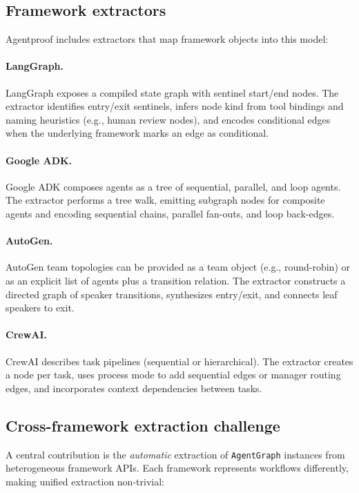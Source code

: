 \subsection{Framework extractors}
Agentproof includes extractors that map framework objects into this model:

\paragraph{LangGraph.}
LangGraph exposes a compiled state graph with sentinel start/end nodes. The
extractor identifies entry/exit sentinels, infers node kind from tool bindings
and naming heuristics (e.g., human review nodes), and encodes conditional edges
when the underlying framework marks an edge as conditional.

\paragraph{Google ADK.}
Google ADK composes agents as a tree of sequential, parallel, and loop agents.
The extractor performs a tree walk, emitting subgraph nodes for composite
agents and encoding sequential chains, parallel fan-outs, and loop back-edges.

\paragraph{AutoGen.}
AutoGen team topologies can be provided as a team object (e.g., round-robin) or
as an explicit list of agents plus a transition relation. The extractor
constructs a directed graph of speaker transitions, synthesizes entry/exit, and
connects leaf speakers to exit.

\paragraph{CrewAI.}
CrewAI describes task pipelines (sequential or hierarchical). The extractor
creates a node per task, uses process mode to add sequential edges or manager
routing edges, and incorporates context dependencies between tasks.

\subsection{Cross-framework extraction challenge}
\label{sec:extraction_challenge}

A central contribution is the \emph{automatic} extraction of
\texttt{AgentGraph} instances from heterogeneous framework APIs. Each
framework represents workflows differently, making unified extraction
non-trivial:

